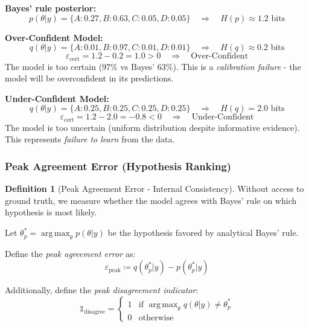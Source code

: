 \documentclass{article}
\DeclareMathOperator*{\argmax}{arg\,max}
\theoremstyle{definition}
\newtheorem{definition}{Definition}
\begin{document}
\textbf{Bayes' rule posterior:}
\begin{equation*}
p(\theta|y) = \{A: 0.27, B: 0.63, C: 0.05, D: 0.05\} \quad \Rightarrow \quad H(p) \approx 1.2 \text{ bits}
\end{equation*}

\textbf{Over-Confident Model:}
\begin{equation*}
q(\theta|y) = \{A: 0.01, B: 0.97, C: 0.01, D: 0.01\} \quad \Rightarrow \quad H(q) \approx 0.2 \text{ bits}
\end{equation*}
\begin{equation*}
\varepsilon_{\text{cert}} = 1.2 - 0.2 = 1.0 > 0 \quad \Rightarrow \quad \text{Over-Confident}
\end{equation*}
The model is too certain (97\% vs Bayes' 63\%). This is a \emph{calibration failure} - the model will be overconfident in its predictions.

\textbf{Under-Confident Model:}
\begin{equation*}
q(\theta|y) = \{A: 0.25, B: 0.25, C: 0.25, D: 0.25\} \quad \Rightarrow \quad H(q) = 2.0 \text{ bits}
\end{equation*}
\begin{equation*}
\varepsilon_{\text{cert}} = 1.2 - 2.0 = -0.8 < 0 \quad \Rightarrow \quad \text{Under-Confident}
\end{equation*}
The model is too uncertain (uniform distribution despite informative evidence). This represents \emph{failure to learn} from the data.

\subsubsection{Peak Agreement Error (Hypothesis Ranking)}

\begin{definition}[Peak Agreement Error - Internal Consistency]
Without access to ground truth, we measure whether the model agrees with Bayes' rule on which hypothesis is most likely.

Let $\theta_p^* = \argmax_{\theta} p(\theta|y)$ be the hypothesis favored by analytical Bayes' rule.

Define the \emph{peak agreement error} as:
\begin{equation}
\varepsilon_{\text{peak}} \coloneqq q(\theta_p^*|y) - p(\theta_p^*|y)
\end{equation}

Additionally, define the \emph{peak disagreement indicator}:
\begin{equation}
\mathbb{1}_{\text{disagree}} = \begin{cases}
1 & \text{if } \argmax_{\theta} q(\theta|y) \neq \theta_p^* \\
0 & \text{otherwise}
\end{cases}
\end{equation}
\end{definition}
\end{document}
